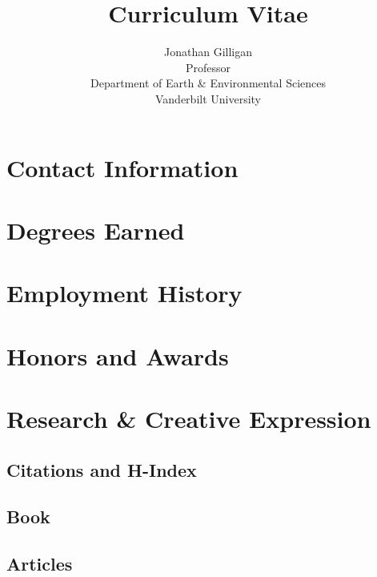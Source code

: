 \documentclass[10pt]{article}
\title{Curriculum Vitae}
\date{\thedate}
\author{Jonathan Gilligan\\
\normalsize Professor\\
Department of Earth \& Environmental Sciences\\
Vanderbilt University}
\begin{document}
\maketitle
\tableofcontents

\section{Contact Information}


\section{Degrees Earned}
\begin{description}
  
\end{description}
\section{Employment History}


\section{Honors and Awards}


\section{Research \& Creative Expression}
    \subsection{Citations and H-Index}
    
    \nocite{*}%
  \subsection[Book]{Book}
        \begin{refsection}
            \nocite{*}
            \printbibliography[heading=none,type=book]
        \end{refsection}
  \subsection[Articles]{Articles}
    \begin{refsection}
        \nocite{*}
        \printbibliography[heading=none,type=article]
    \end{refsection}
\end{document}
